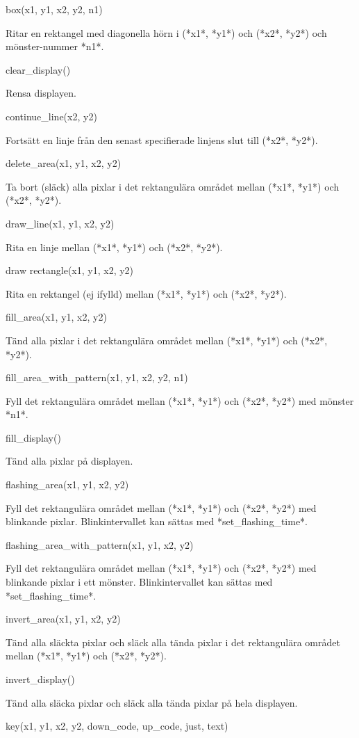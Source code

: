 \documentclass[10pt,oneside,swedish]{lips-no_customer}
\begin{document}
box(x1, y1, x2, y2, n1)

Ritar en rektangel med diagonella hörn i (*x1*, *y1*) och (*x2*, *y2*)
och mönster-nummer *n1*.

clear\_display()

Rensa displayen.

continue\_line(x2, y2)

Fortsätt en linje från den senast specifierade linjens slut till (*x2*,
*y2*).

delete\_area(x1, y1, x2, y2)

Ta bort (släck) alla pixlar i det rektangulära området mellan (*x1*,
*y1*) och (*x2*, *y2*).

draw\_line(x1, y1, x2, y2)

Rita en linje mellan (*x1*, *y1*) och (*x2*, *y2*).

draw rectangle(x1, y1, x2, y2)

Rita en rektangel (ej ifylld) mellan (*x1*, *y1*) och (*x2*, *y2*).

fill\_area(x1, y1, x2, y2)

Tänd alla pixlar i det rektangulära området mellan (*x1*, *y1*) och
(*x2*, *y2*).

fill\_area\_with\_pattern(x1, y1, x2, y2, n1)

Fyll det rektangulära området mellan (*x1*, *y1*) och (*x2*, *y2*) med
mönster *n1*.

fill\_display()

Tänd alla pixlar på displayen.

flashing\_area(x1, y1, x2, y2)

Fyll det rektangulära området mellan (*x1*, *y1*) och (*x2*, *y2*) med
blinkande pixlar. Blinkintervallet kan sättas med *set\_flashing\_time*.

flashing\_area\_with\_pattern(x1, y1, x2, y2)

Fyll det rektangulära området mellan (*x1*, *y1*) och (*x2*, *y2*) med
blinkande pixlar i ett mönster. Blinkintervallet kan sättas med
*set\_flashing\_time*.

invert\_area(x1, y1, x2, y2)

Tänd alla släckta pixlar och släck alla tända pixlar i det rektangulära
området mellan (*x1*, *y1*) och (*x2*, *y2*).

invert\_display()

Tänd alla släcka pixlar och släck alla tända pixlar på hela displayen.

key(x1, y1, x2, y2, down\_code, up\_code, just, text)
\end{document}
